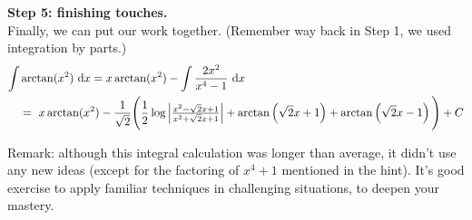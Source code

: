 \begin{solution}
\textbf{Step 5: finishing touches.}\\
Finally, we can put our work together. (Remember way back in Step 1, we used integration by parts.)
\begin{align*}
\int& \arctan(x^2)~\mathrm{d}x = x\arctan(x^2) - \int \frac{2x^2}{x^4-1}~\mathrm{d}x\\
&=~x\arctan(x^2) -
\frac{1}{\sqrt 2}\Bigg( \frac{1}{2}\log\left|\tfrac{x^2-\sqrt2x+1}{ x^2+\sqrt2x+1}\right|
+\arctan\left(\sqrt{2}x+1\right)+ \arctan\left(\sqrt{2}x-1\right)
\Bigg)+C
\end{align*}

Remark: although this integral calculation was longer than average, it didn't use any new ideas (except for the factoring of $x^4+1$ mentioned in the hint). It's good exercise to apply familiar techniques in challenging situations, to deepen your mastery.
\end{solution}
